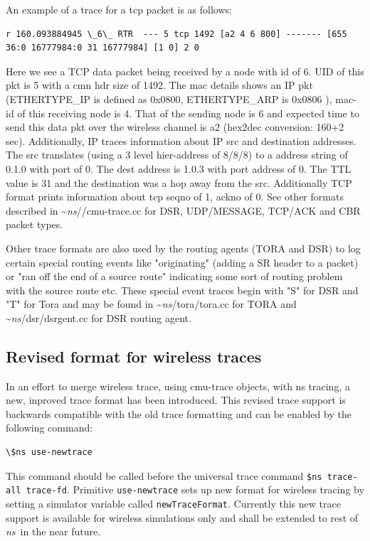An example of a trace for a tcp packet is as follows:
\begin{verbatim}
r 160.093884945 \_6\_ RTR  --- 5 tcp 1492 [a2 4 6 800] ------- [655
36:0 16777984:0 31 16777984] [1 0] 2 0
\end{verbatim}
Here we see a TCP data packet being received by a node with id of 6. UID
of this pkt is 5 with a cmn hdr size of 1492. The mac details shows an IP
pkt (ETHERTYPE\_IP is defined as 0x0800, ETHERTYPE\_ARP is 0x0806 ), mac-id
of this receiving node is 4. That of the sending node is 6 and expected
time to send this data pkt over the wireless channel is a2 (hex2dec
conversion: 160+2 sec). Additionally, IP traces information about IP src
and destination addresses. The src translates (using a 3 level
hier-address of 8/8/8) to a address string of 0.1.0 with port of 0. The
dest address is 1.0.3 with port address of 0. The TTL value is 31 and the
destination was a hop away from the src. Additionally TCP format prints
information about tcp seqno of 1, ackno of 0. See other formats described
in \textasciitilde\emph{ns}//cmu-trace.cc for DSR, UDP/MESSAGE, TCP/ACK and CBR packet types.

Other trace formats are also used by the routing agents (TORA and DSR) to
log certain special routing events like "originating" (adding a SR header
to a packet) or  "ran off the end of a source route" indicating some sort
of routing problem with the source route etc. These special event traces
begin with "S" for DSR and "T" for Tora and may
be found in \textasciitilde\emph{ns}/{tora/tora.cc} for TORA and \textasciitilde\emph{ns}/{dsr/dsrgent.cc} for DSR
routing agent.


\subsection{Revised format for wireless traces}
\label{sec:revtraceformat}

In an effort to merge wireless trace, using cmu-trace objects, with
ns tracing, a new, inproved trace format has been introduced. This revised
trace support is backwards compatible with the old trace formatting and
can be enabled by the following command:
\begin{verbatim}
\$ns use-newtrace
\end{verbatim}
This command should be called before the universal trace command
{\tt \$ns trace-all \<trace-fd\>}. Primitive {\tt use-newtrace} sets up new
format for wireless tracing by setting a simulator variable called
{\tt newTraceFormat}. Currently this new trace support is available for
wireless simulations only and shall be extended to rest of \emph{ns}\ in the near
future.

